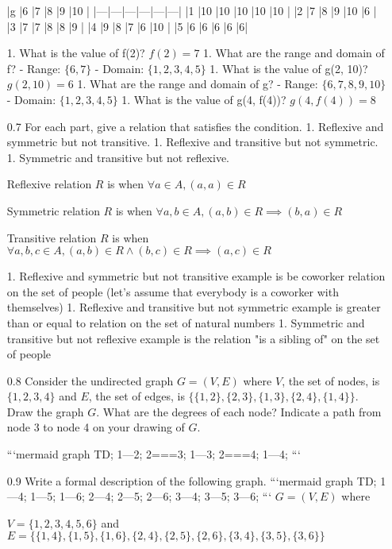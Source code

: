 \documentclass[12pt, a4paper]{article}
\begin{document}
\begin{enumerate}
|g |6 |7 |8 |9 |10 |
|---|---|---|---|---|---|
|1 |10 |10 |10 |10 |10 |
|2 |7 |8 |9 |10 |6 |
|3 |7 |7 |8 |8 |9 |
|4 |9 |8 |7 |6 |10 |
|5 |6 |6 |6 |6 |6|

1. What is the value of f(2)? 
    $f(2) = 7$
1. What are the range and domain of f?
    - Range: $\{6, 7\}$
    - Domain: $\{1, 2, 3, 4, 5\}$
1. What is the value of g(2, 10)?
    $g(2, 10) = 6$
1. What are the range and domain of g?
    - Range: $\{6, 7, 8, 9, 10\}$
    - Domain: $\{1, 2, 3, 4, 5\}$
1. What is the value of g(4, f(4))?
    $g(4, f(4)) = 8$

    \item[0.7]
For each part, give a relation that satisfies the condition.
1. Reflexive and symmetric but not transitive.
1. Reflexive and transitive but not symmetric.
1. Symmetric and transitive but not reflexive.

Reflexive relation $R$ is when $\forall a \in A, (a, a) \in R$

Symmetric relation $R$ is when $\forall a, b \in A, (a, b) \in R \implies (b, a) \in R$

Transitive relation $R$ is when $\forall a, b, c \in A, (a, b) \in R \land (b, c) \in R \implies (a, c) \in R$

1. Reflexive and symmetric but not transitive example is be coworker relation on the set of people (let's assume that everybody is a coworker with themselves)
1. Reflexive and transitive but not symmetric example is greater than or equal to relation on the set of natural numbers
1. Symmetric and transitive but not reflexive example is the relation "is a sibling of" on the set of people

    \item[0.8]
Consider the undirected graph $G = (V, E)$ where $V$, the set of nodes, is $\{1, 2, 3, 4\}$ and $E$, the set of edges, is $\{\{1, 2\}, \{2, 3\}, \{1, 3\}, \{2, 4\}, \{1, 4\}\}$. Draw the graph $G$. What are the degrees of each node? Indicate a path from node 3 to node 4 on your drawing of $G$.

```mermaid
graph TD;
    1---2;
    2===3;
    1---3;
    2===4;
    1---4;
```

    \item[0.9]
Write a formal description of the following graph.
```mermaid
graph TD;
    1---4;
    1---5;
    1---6;
    2---4;
    2---5;
    2---6;
    3---4;
    3---5;
    3---6;
```
$G = (V, E)$ where 

$V = \{1, 2, 3, 4, 5, 6\}$ and $E = \{\{1, 4\}, \{1, 5\}, \{1, 6\}, \{2, 4\}, \{2, 5\}, \{2, 6\}, \{3, 4\}, \{3, 5\}, \{3, 6\}\}$
\end{enumerate}
\end{document}
